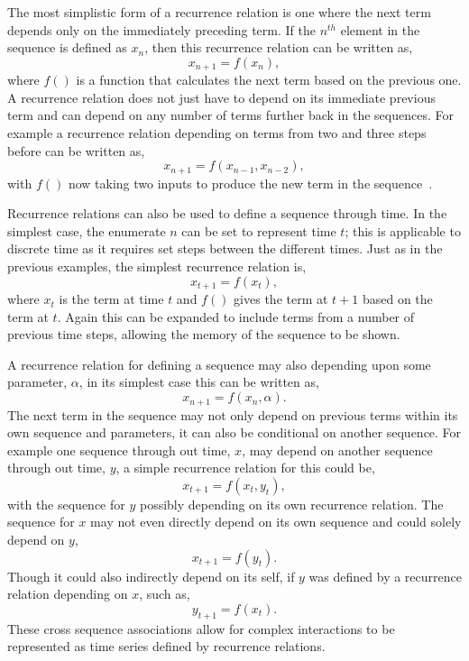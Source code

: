 \documentclass{article}
\begin{document}
The most simplistic form of a recurrence relation is one where the next term depends only on the immediately preceding term. If the $n^{th}$ element in the sequence is defined as  $x_{n}$, then this recurrence relation can be written as,    
\begin{equation}
x_{n+1} = f(x_{n}),
\end{equation}
where $f()$ is a function that calculates the next term based on the previous one. A recurrence relation does not just have to depend on its immediate previous term and can depend on any number of terms further back in the sequences. For example a recurrence relation depending on terms from two and three steps before can be written as, 
\begin{equation}
x_{n+1} = f(x_{n-1}, x_{n-2}),
\end{equation}
with $f()$ now taking two inputs to produce the new term in the sequence~\cite{recurrealtionwebpage}.

Recurrence relations can also be used to define a sequence through time. In the simplest case, the enumerate $n$ can be set to represent time $t$; this is applicable to discrete time as it requires set steps between the different times. Just as in the previous examples, the simplest recurrence relation is,  
\begin{equation}
x_{t+1} = f(x_{t}),
\end{equation}
where $x_{t}$ is the term at time $t$ and $f()$ gives the term at $t+1$ based on the term at $t$. Again this can be expanded to include terms from a number of previous time steps, allowing the memory of the sequence to be shown.
 
A recurrence relation for defining a sequence may also depending upon some parameter,  $\alpha$, in its simplest case this can be written as, 
\begin{equation}
x_{n+1} = f(x_{n}, \alpha).
\end{equation}
The next term in the sequence may not only depend on previous terms within its own sequence and parameters, it can also be conditional on another sequence. For example one sequence through out time, $x$, may depend on another sequence through out time, $y$, a simple recurrence relation for this could be,
\begin{equation}
x_{t+1} = f(x_{t}, y_{t}),
\end{equation}
with the sequence for $y$ possibly depending on its own recurrence relation. The sequence for $x$ may not even directly depend on its own sequence and could solely depend on $y$, 
\begin{equation}
x_{t+1} = f(y_{t}).
\end{equation}
Though it could also indirectly depend on its self, if $y$ was defined by a recurrence relation depending on $x$, such as, 
\begin{equation}
y_{t+1} = f(x_{t}).
\end{equation}
These cross sequence associations allow for complex interactions to be represented as time series defined by recurrence relations.
\end{document}
